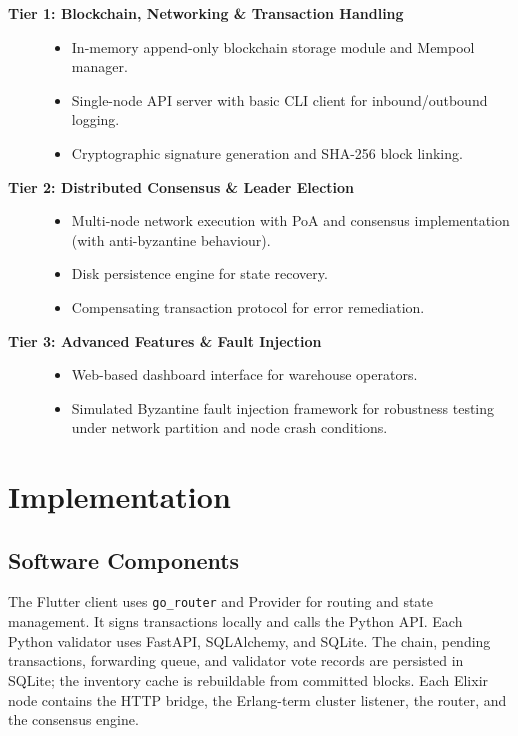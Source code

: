 \documentclass[11pt, a4paper, oneside]{memoir}
\begin{document}
\begin{description}
    \item[\textbf{Tier 1: Blockchain, Networking \& Transaction Handling}]\hfill
    \begin{itemize}
        \item In-memory append-only blockchain storage module and Mempool manager.
        \item Single-node API server with basic CLI client for inbound/outbound logging.
        \item Cryptographic signature generation and SHA-256 block linking.
    \end{itemize}

    \item[\textbf{Tier 2: Distributed Consensus \& Leader Election}]\hfill
    \begin{itemize}
        \item Multi-node network execution with PoA and consensus implementation (with anti-byzantine behaviour).
        \item Disk persistence engine for state recovery.
        \item Compensating transaction protocol for error remediation.
    \end{itemize}

    \item[\textbf{Tier 3: Advanced Features \& Fault Injection}]\hfill
    \begin{itemize}
        \item Web-based dashboard interface for warehouse operators.
        \item Simulated Byzantine fault injection framework for robustness testing under network partition and node crash conditions.
    \end{itemize}
\end{description}


\chapter{Implementation}\label{ch:implementation}

\section{Software Components}
The Flutter client uses \texttt{go\_router} and Provider for routing and state management. It signs transactions locally and calls the Python API. Each
Python validator uses FastAPI, SQLAlchemy, and SQLite. The chain, pending
transactions, forwarding queue, and validator vote records are persisted in
SQLite; the inventory cache is rebuildable from committed blocks. Each Elixir
node contains the HTTP bridge, the Erlang-term cluster listener, the router,
and the consensus engine.
\end{document}

